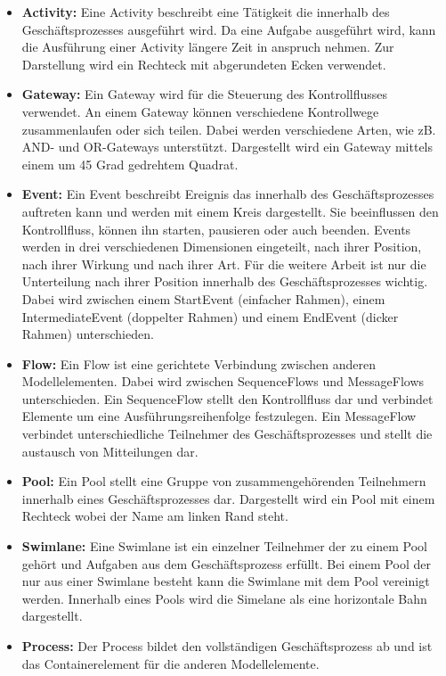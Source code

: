 \begin{itemize}
    \item \textbf{Activity:} 
    Eine Activity beschreibt eine Tätigkeit die innerhalb des Geschäftsprozesses ausgeführt wird.
    Da eine Aufgabe ausgeführt wird, kann die Ausführung einer Activity längere Zeit in anspruch nehmen.
    Zur Darstellung wird ein Rechteck mit abgerundeten Ecken verwendet.
    \item \textbf{Gateway:}
    Ein Gateway wird für die Steuerung des Kontrollflusses verwendet. 
    An einem Gateway können verschiedene Kontrollwege zusammenlaufen oder sich teilen. 
    Dabei werden verschiedene Arten, wie zB. AND- und OR-Gateways unterstützt. 
    Dargestellt wird ein Gateway mittels einem um 45 Grad gedrehtem Quadrat. 
    \item \textbf{Event:}
    Ein Event beschreibt Ereignis das innerhalb des Geschäftsprozesses auftreten kann und werden mit einem Kreis dargestellt.
    Sie beeinflussen den Kontrollfluss, können ihn starten, pausieren oder auch beenden.
    Events werden in drei verschiedenen Dimensionen eingeteilt, nach ihrer Position, nach ihrer Wirkung und nach ihrer Art.
    Für die weitere Arbeit ist nur die Unterteilung nach ihrer Position innerhalb des Geschäftsprozesses wichtig.
    Dabei wird zwischen einem StartEvent (einfacher Rahmen), einem IntermediateEvent (doppelter Rahmen) und einem EndEvent (dicker Rahmen) unterschieden.
    \item \textbf{Flow:}
    Ein Flow ist eine gerichtete Verbindung zwischen anderen Modellelementen.
    Dabei wird zwischen SequenceFlows und MessageFlows unterschieden.
    Ein SequenceFlow stellt den Kontrollfluss dar und verbindet Elemente um eine Ausführungsreihenfolge festzulegen.
    Ein MessageFlow verbindet unterschiedliche Teilnehmer des Geschäftsprozesses und stellt die austausch von Mitteilungen dar.
    \item \textbf{Pool:}
    Ein Pool stellt eine Gruppe von zusammengehörenden Teilnehmern innerhalb eines Geschäftsprozesses dar.
    Dargestellt wird ein Pool mit einem Rechteck wobei der Name am linken Rand steht.
    \item \textbf{Swimlane:}
    Eine Swimlane ist ein einzelner Teilnehmer der zu einem Pool gehört und Aufgaben aus dem Geschäftsprozess erfüllt.
    Bei einem Pool der nur aus einer Swimlane besteht kann die Swimlane mit dem Pool vereinigt werden.
    Innerhalb eines Pools wird die Simelane als eine horizontale Bahn dargestellt.
    \item \textbf{Process:}
    Der Process bildet den vollständigen Geschäftsprozess ab und ist das Containerelement für die anderen Modellelemente.
\end{itemize}

